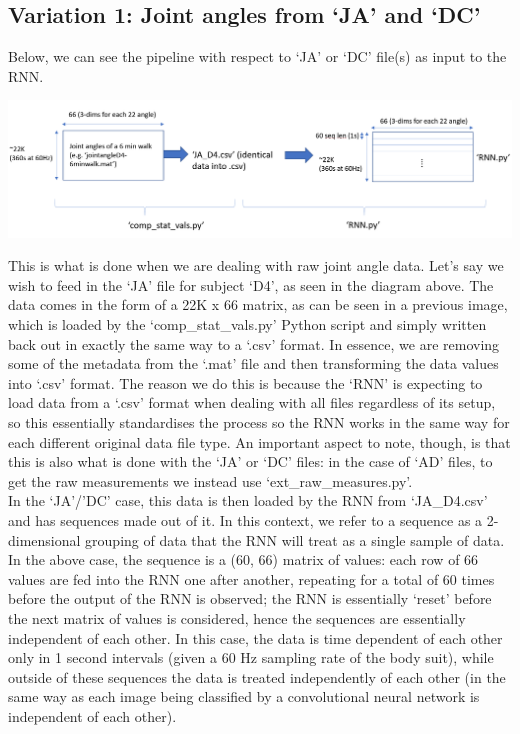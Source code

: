 \documentclass[12pt,twoside]{report}
\begin{document}
\subsection{Variation 1: Joint angles from ‘JA’ and ‘DC’}

\quad Below, we can see the pipeline with respect to ‘JA’ or ‘DC’ file(s) as input to the RNN.

\begin{center}
\includegraphics[scale=0.2]{project_figures/fig8_6}
\end{center}

\quad This is what is done when we are dealing with raw joint angle data. Let’s say we wish to feed in the ‘JA’ file for subject ‘D4’, as seen in the diagram above. The data comes in the form of a 22K x 66 matrix, as can be seen in a previous image, which is loaded by the ‘comp\_stat\_vals.py’ Python script and simply written back out in exactly the same way to a ‘.csv’ format. In essence, we are removing some of the metadata from the ‘.mat’ file and then transforming the data values into ‘.csv’ format. The reason we do this is because the ‘RNN’ is expecting to load data from a ‘.csv’ format when dealing with all files regardless of its setup, so this essentially standardises the process so the RNN works in the same way for each different original data file type. An important aspect to note, though, is that this is also what is done with the ‘JA’ or ‘DC’ files: in the case of ‘AD’ files, to get the raw measurements we instead use ‘ext\_raw\_measures.py’.\\

\quad In the ‘JA’/’DC’ case, this data is then loaded by the RNN from ‘JA\_D4.csv’ and has sequences made out of it. In this context, we refer to a sequence as a 2-dimensional grouping of data that the RNN will treat as a single sample of data. In the above case, the sequence is a (60, 66) matrix of values: each row of 66 values are fed into the RNN one after another, repeating for a total of 60 times before the output of the RNN is observed; the RNN is essentially ‘reset’ before the next matrix of values is considered, hence the sequences are essentially independent of each other. In this case, the data is time dependent of each other only in 1 second intervals (given a 60 Hz sampling rate of the body suit), while outside of these sequences the data is treated independently of each other (in the same way as each image being classified by a convolutional neural network is independent of each other).
\end{document}
